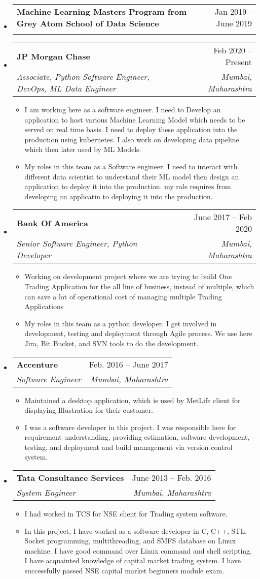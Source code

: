 \documentclass[letterpaper,12pt]{article}[leftmargin=*]
\makeatletter
\def \entryspacing {-0pt}
\newcommand{\resumeEntryStart}{\begin{itemize}[leftmargin=2.5mm]}
\newcommand{\resumeEntryEnd}{\end{itemize}\vspace{\entryspacing}}
\newcommand{\resumeItemListStart}{\begin{itemize}[leftmargin=4.5mm]}
\newcommand{\resumeItemListEnd}{\end{itemize}}
\newcommand{\resumeItem}[1]{
  \item\small{
    {#1 \vspace{-2pt}}
  }
}
\newcommand{\resumeEntryTSDL}[4]{
  \vspace{-1pt}\item[]
    \begin{tabular*}{0.97\textwidth}{l@{\extracolsep{\fill}}r}
      \textbf{\color{primary}#1} & {\firabook\color{accent}\small#2} \\
      \textit{\color{accent}\small#3} & \textit{\color{accent}\small#4} \\
    \end{tabular*}\vspace{-6pt}
}
\makeatother
\begin{document}
\resumeEntryStart
    \resumeEntryTSDL
      {Machine Learning Masters Program from Grey Atom School of Data Science}{Jan 2019 - June 2019}
  \resumeEntryEnd
  
 \resumeEntryStart
    \resumeEntryTSDL
      {JP Morgan Chase}{Feb 2020 -- Present}
      {Associate, Python Software Engineer, DevOps, ML Data Engineer }{Mumbai, Maharashtra}
    \resumeItemListStart
      \resumeItem {I am working here as a software engineer. I need to Develop an application to host various Machine Learning Model which needs to be served on real time basis. I need to deploy these application into the production using kubernetes. I also work on developing data pipeline which then later used by ML Models. }
      \resumeItem {My roles in this team as a Software engineer.  I need to interact with different data scientist to understand their ML model then design an application to deploy it into the production. my role requires from developing an applicatin to deploying it into the production.}
    \resumeItemListEnd
   \resumeEntryEnd
    \resumeEntryStart
    \resumeEntryTSDL
      {Bank Of America}{June 2017 -- Feb 2020}
      {Senior Software Engineer, Python Developer }{Mumbai, Maharashtra}
    \resumeItemListStart
      \resumeItem {Working on development project where we are trying to build One Trading Application for the all line of
business, instead of multiple, which can save a lot of operational cost of managing multiple Trading
Applications }
      \resumeItem {My roles in this team as a python developer. I get involved in development, testing and deployment through
Agile process. We use here Jira, Bit Bucket, and SVN tools to do the development.
}
    \resumeItemListEnd
   \resumeEntryEnd
  \resumeEntryStart
    \resumeEntryTSDL
      {Accenture}{Feb. 2016 -- June 2017}
      {Software Engineer}{Mumbai, Maharashtra}
    \resumeItemListStart
      \resumeItem {Maintained a desktop application, which is used by MetLife client for displaying Illustration for their customer. }
      \resumeItem {I was a software developer in this project. I was responsible here for requirement understanding, providing estimation, software development, testing, and deployment and build management via version control system.}
    \resumeItemListEnd
  \resumeEntryEnd

  \resumeEntryStart
    \resumeEntryTSDL
      {Tata Consultance Services}{June 2013 -- Feb. 2016}
      {System Engineer}{Mumbai, Maharashtra}
    \resumeItemListStart
        \resumeItem {I had worked in TCS for NSE client for Trading system software. }
\resumeItem {In this project, I have worked as a software developer in C, C++, STL, Socket programming, multithreading, and SMFS database on Linux machine. I have good command over Linux command and shell scripting. I have acquainted knowledge of capital market trading system. I have successfully passed NSE capital market beginners module exam.}
    \resumeItemListEnd
  \resumeEntryEnd
\end{document}
